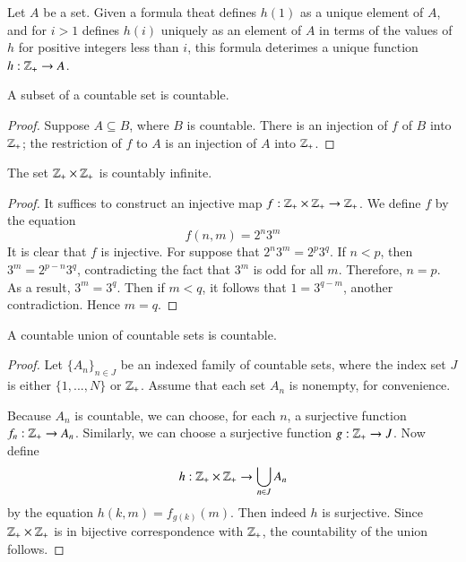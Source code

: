 \documentclass[12pt, a4paper, oneside, openright, titlepage]{book}
\begin{document}
\begin{appendices}
    \begin{cust}
        Let $A$ be a set. Given a formula theat defines $h(1)$ as a unique element of $A$, and for $i > 1$ defines $h(i)$ uniquely as an element of $A$ in terms of the values of $h$ for positive integers less than $i$, this formula deterimes a unique function $h:\mathbb Z_+\rightarrow A$.
    \end{cust}


    \begin{cor}
        A subset of a countable set is countable.
    \end{cor}
    \begin{proof}
        Suppose $A \subseteq B$, where $B$ is countable. There is an injection of $f$ of $B$ into $\mathbb Z_+$; the restriction of $f$ to $A$ is an injection of $A$ into $\mathbb Z_+$.
    \end{proof}


    \begin{cor}
        The set $\mathbb Z_+\times \mathbb Z_+$ is countably infinite.
    \end{cor}
    \begin{proof}
        It suffices to construct an injective map $f:\mathbb Z_+\times \mathbb Z_+\rightarrow \mathbb Z_+$. We define $f$ by the equation $$f(n,m) = 2^n3^m$$ It is clear that $f$ is injective. For suppose that $2^n3^m = 2^p3^q$. If $n < p$, then $3^m = 2^{p-n}3^q$, contradicting the fact that $3^m$ is odd for all $m$. Therefore, $n = p$. As a result, $3^m = 3^q$. Then if $m < q$, it follows that $1 = 3^{q-m}$, another contradiction. Hence $m = q$.
    \end{proof}


    \begin{thm}
        A countable union of countable sets is countable.
    \end{thm}
    \begin{proof}
        Let $\{A_n\}_{n\in J}$ be an indexed family of countable sets, where the index set $J$ is either $\{1,...,N\}$ or $\mathbb Z_+$. Assume that each set $A_n$ is nonempty, for convenience.

        Because $A_n$ is countable, we can choose, for each $n$, a surjective function $f_n:\mathbb Z_+\rightarrow A_n$. Similarly, we can choose a surjective function $g:\mathbb Z_+\rightarrow J$. Now define \begin{equation*}
            h:\mathbb Z_+\times \mathbb Z_+\rightarrow \bigcup\limits_{n\in J}A_n
        \end{equation*}
        by the equation $h(k,m) = f_{g(k)}(m)$. Then indeed $h$ is surjective. Since $\mathbb Z_+\times\mathbb Z_+$ is in bijective correspondence with $\mathbb Z_+$, the countability of the union follows.
    \end{proof}


\end{appendices}
\end{document}
